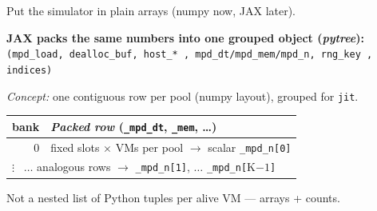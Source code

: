 \documentclass[11pt,aspectratio=43]{beamer}
\begin{document}
\begin{frame}[t]{Put the simulator in plain arrays (numpy now, JAX later).}

  \vspace{0.4em}
  \textbf{JAX packs the same numbers into one grouped object (\emph{pytree}):}\\[0.25em]
  \centering
  {\fontsize{9}{10}\selectfont\texttt{(mpd\_load,\; dealloc\_buf,\; host\_*\,,\; mpd\_dt/\allowbreak mpd\_mem/\allowbreak mpd\_n,\; rng\_key\,,\; indices)}}

  \vspace{0.35em}\raggedright
  {\scriptsize
  \emph{Concept:} one contiguous row per pool (numpy layout), grouped for \texttt{jit}.}
  {\scriptsize\setlength{\tabcolsep}{5pt}%
  \begin{tabular}{@{}r @{${}\Rightarrow{}$\ }p{\dimexpr\linewidth-3.4cm\relax}@{}}
    \toprule
    \multicolumn{1}{c}{\textbf{bank}} &
      \multicolumn{1}{l}{\textit{Packed row} (\texttt{\_mpd\_dt}, \texttt{\_mem}, \ldots)} \\
    \midrule
    0 & fixed slots \(\times\) VMs per pool \(\rightarrow\) scalar \texttt{\_mpd\_n[0]}\\
    \multicolumn{2}{l}{\(\vdots\) \ \(\ldots\) analogous rows \(\rightarrow\) \texttt{\_mpd\_n[1]}, \(\ldots\) \texttt{\_mpd\_n[}K$-1$\texttt{]}}\\
    \bottomrule
  \end{tabular}\par\vspace{0.08em}}
  {\fontsize{7}{8}\selectfont\color{black!53}%
  Not a nested list of Python tuples per alive VM --- arrays + counts.}

\end{frame}

\end{document}

